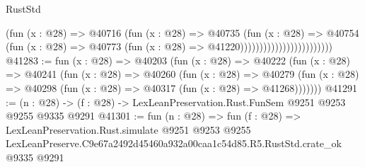 \begin{lexlean}{RustStd}
\begin{coremodule}
                                          (fun (x : @28) =>
                                          @40716
                                            (fun (x : @28) =>
                                            @40735
                                              (fun (x : @28) =>
                                              @40754
                                                (fun (x : @28) =>
                                                @40773
                                                  (fun (x : @28) => @41220))))))))))))))))))))))))
@41283 := fun (x : @28) =>
  @40203
    (fun (x : @28) =>
    @40222
      (fun (x : @28) =>
      @40241
        (fun (x : @28) =>
        @40260
          (fun (x : @28) =>
          @40279 (fun (x : @28) => @40298 (fun (x : @28) => @40317 (fun (x : @28) => @41268)))))))
@41291 := (n : @28) -> (f : @28) -> LexLeanPreservation.Rust.FunSem @9251 @9253 @9255 @9335 @9291
@41301 := fun (n : @28) =>
  fun (f : @28) =>
  LexLeanPreservation.Rust.simulate
    @9251
    @9253
    @9255
    LexLeanPreserve.C9e67a2492d45460a932a00caa1c54d85.R5.RustStd.crate_ok
    @9335
    @9291
\end{coremodule}
\end{lexlean}
